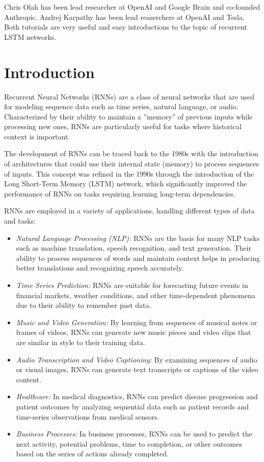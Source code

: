 Chris Olah has been lead researcher at OpenAI and Google Brain and co-founded Anthropic. Andrej Karpathy has been lead reaserchers at OpenAI and Tesla. Both tutorials are very useful and easy introductions to the topic of recurrent LSTM networks.

\section{Introduction}

Recurrent Neural Networks (RNNs) are a class of neural networks that are used for modeling sequence data such as time series, natural language, or audio. Characterized by their ability to maintain a ''memory'' of previous inputs while processing new ones, RNNs are particularly useful for tasks where historical context is important.

The development of RNNs can be traced back to the 1980s with the introduction of architectures that could use their internal state (memory) to process sequences of inputs. This concept was refined in the 1990s through the introduction of the Long Short-Term Memory (LSTM) network, which significantly improved the performance of RNNs on tasks requiring learning long-term dependencies.

RNNs are employed in a variety of applications, handling different types of data and tasks:
\begin{itemize}
\item \emph{Natural Language Processing (NLP):} RNNs are the basis for many NLP tasks such as machine translation, speech recognition, and text generation. Their ability to process sequences of words and maintain context helps in producing better translations and recognizing speech accurately.
\item \emph{Time Series Prediction:} RNNs are suitable for forecasting future events in financial markets, weather conditions, and other time-dependent phenomena due to their ability to remember past data.
\item \emph{Music and Video Generation:} By learning from sequences of musical notes or frames of videos, RNNs can generate new music pieces and video clips that are similar in style to their training data.
\item \emph{Audio Transcription and Video Captioning:} By examining sequences of audio or visual images, RNNs can generate text transcripts or captions of the video content.  
\item \emph{Healthcare:} In medical diagnostics, RNNs can predict disease progression and patient outcomes by analyzing sequential data such as patient records and time-series observations from medical sensors.
\item \emph{Business Processes:} In business processes, RNNs can be used to predict the next activity, potential problems, time to completion, or other outcomes based on the series of actions already completed.
\end{itemize}

